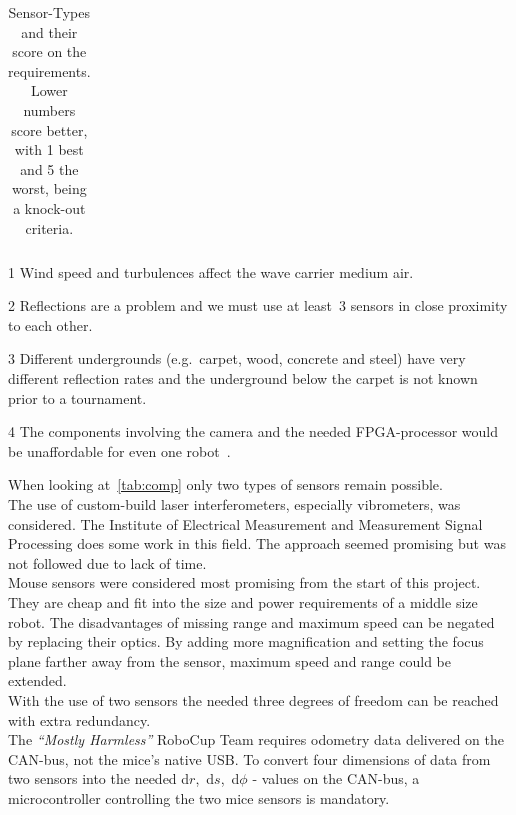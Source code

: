 \documentclass[12pt,a4paper]{article}
\newcommand{\MH}{\emph{``Mostly Harmless''} RoboCup Team\xspace}
\begin{document}
\begin{table}[htbp]
\begin{threeparttable}[b]
\begin{tabular}{rlllllll}
     \hline
  \end{tabular}
  \begin{tablenotes}
  \item [1] Wind speed and turbulences affect the wave carrier medium air.
  \item [2] Reflections are a problem and we must use at least~3 sensors in close proximity to each other.
  \item [3] Different undergrounds (e.g.\ carpet, wood, concrete and steel) have very different reflection rates and the underground below the carpet is not known prior to a tournament.
  \item [4] The components involving the camera and the needed FPGA-processor would be unaffordable for even one robot~\cite{Hrach2006}.
  \end{tablenotes}

  \caption{Sensor-Types and their score on the requirements. Lower numbers score better, with 1 best and 5 the worst, being a knock-out criteria. }
  \label{tab:comp}
 \end{threeparttable}
\end{table}


When looking at~\autoref{tab:comp} only two types of sensors remain possible.\\
The use of custom-build laser interferometers, especially vibrometers, was considered.
The Institute of Electrical Measurement and Measurement Signal Processing does some work in this field.
The approach seemed promising but was not followed due to lack of time.\\
Mouse sensors were considered most promising from the start of this project.
They are cheap and fit into the size and power requirements of a middle size robot.
The disadvantages of missing range and maximum speed can be negated by replacing their optics.
By adding more magnification and setting the focus plane farther away from the sensor, maximum speed and range could be extended.\\
With the use of two sensors the needed three degrees of freedom can be reached with extra redundancy.\\
The \MH requires odometry data delivered on the CAN-bus, not the mice's native USB.
To convert four dimensions of data from two sensors into the needed d$r$,~d$s$,~d$\phi$ - values on the CAN-bus, a microcontroller controlling the two mice sensors is mandatory.
\end{document}

